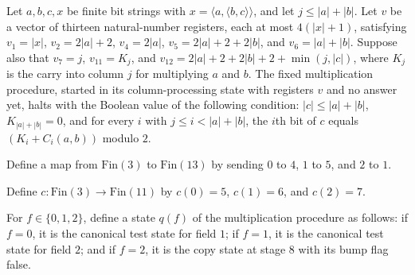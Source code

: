 \begin{lemma}
\label{Complexity.mult_columns_run}
\leanok
{}
Let $a,b,c,x$ be finite bit strings with $x=\langle a,\langle b,c\rangle\rangle$, and
let $j\le |a|+|b|$. Let $v$ be a vector of thirteen natural-number registers, each at
most $4(|x|+1)$, satisfying $v_1=|x|$, $v_2=2|a|+2$, $v_4=2|a|$, $v_5=2|a|+2+2|b|$, and
$v_6=|a|+|b|$. Suppose also that $v_7=j$, $v_{11}=K_j$, and
$v_{12}=2|a|+2+2|b|+2+\min(j,|c|)$, where $K_j$ is the carry into column $j$ for
multiplying $a$ and $b$. The fixed multiplication procedure, started in its
column-processing state with registers $v$ and no answer yet, halts with the Boolean
value of the following condition: $|c|\le |a|+|b|$, $K_{|a|+|b|}=0$, and for every $i$
with $j\le i<|a|+|b|$, the $i$th bit of $c$ equals $(K_i+C_i(a,b))$ modulo $2$.
\end{lemma}

\begin{definition}
\label{Complexity.multCanonSource}
\leanok
Define a map from $\mathrm{Fin}(3)$ to $\mathrm{Fin}(13)$ by sending $0$ to $4$, $1$ to $5$, and
$2$ to $1$.
\end{definition}

\begin{definition}
\label{Complexity.multCanonCopy}
\leanok
Define $c:\mathrm{Fin}(3)\to\mathrm{Fin}(11)$ by $c(0)=5$, $c(1)=6$, and $c(2)=7$.
\end{definition}

\begin{definition}
\label{Complexity.multCanonNext}
\leanok
{}
For $f\in\{0,1,2\}$, define a state $q(f)$ of the multiplication procedure as follows:
if $f=0$, it is the canonical test state for field $1$; if $f=1$, it is the canonical
test state for field $2$; and if $f=2$, it is the copy state at stage $8$ with its bump
flag false.
\end{definition}

